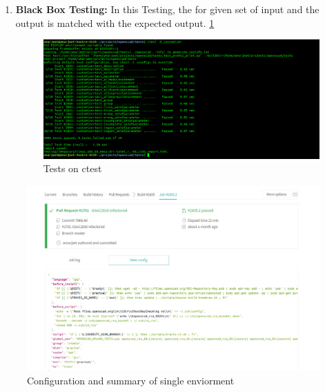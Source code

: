 \begin{enumerate}
     \item \textbf{Black Box Testing:} In this Testing, the for given set of input and the output is matched with the expected output. \ref{fig:ctest}
   
     \begin{figure}[H]
         \centering
         \includegraphics[width=\linewidth]{images/ctest}
         \caption{Tests on ctest}
         \label{fig:ctest}
     \end{figure}
   
 \end{enumerate}

\begin{figure}[H]
    \centering
    \includegraphics[width=\linewidth]{images/travisSpecific}
    \caption{Configuration and summary of single enviorment}
    \label{fig:travisSpecific}
\end{figure}
 
